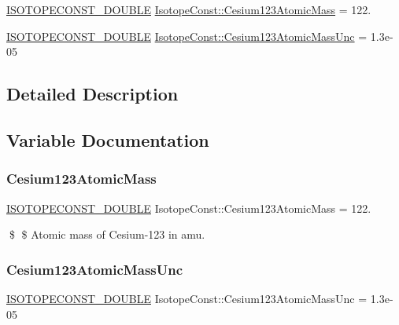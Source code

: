 \begin{DoxyCompactItemize}
\item 
\mbox{\hyperlink{group___isotope_const-_macros_ga8f45a7272ce02c0b4c65c44636ed719a}{I\+S\+O\+T\+O\+P\+E\+C\+O\+N\+S\+T\+\_\+\+D\+O\+U\+B\+LE}} \mbox{\hyperlink{group___isotope_const-_cesium-_cs123_gaa872133985113e652a28419c9e14dd48}{Isotope\+Const\+::\+Cesium123\+Atomic\+Mass}} = 122.
\item 
\mbox{\hyperlink{group___isotope_const-_macros_ga8f45a7272ce02c0b4c65c44636ed719a}{I\+S\+O\+T\+O\+P\+E\+C\+O\+N\+S\+T\+\_\+\+D\+O\+U\+B\+LE}} \mbox{\hyperlink{group___isotope_const-_cesium-_cs123_gab71ac0a46a95a079785107cbdcbf6e0a}{Isotope\+Const\+::\+Cesium123\+Atomic\+Mass\+Unc}} = 1.\+3e-\/05
\end{DoxyCompactItemize}


\subsection{Detailed Description}


\subsection{Variable Documentation}
\mbox{\label{group___isotope_const-_cesium-_cs123_gaa872133985113e652a28419c9e14dd48}} 
\subsubsection{\texorpdfstring{Cesium123\+Atomic\+Mass}{Cesium123AtomicMass}}
{\footnotesize\ttfamily \mbox{\hyperlink{group___isotope_const-_macros_ga8f45a7272ce02c0b4c65c44636ed719a}{I\+S\+O\+T\+O\+P\+E\+C\+O\+N\+S\+T\+\_\+\+D\+O\+U\+B\+LE}} Isotope\+Const\+::\+Cesium123\+Atomic\+Mass = 122.}

\$ \$ Atomic mass of Cesium-\/123 in amu. \mbox{\label{group___isotope_const-_cesium-_cs123_gab71ac0a46a95a079785107cbdcbf6e0a}} 
\subsubsection{\texorpdfstring{Cesium123\+Atomic\+Mass\+Unc}{Cesium123AtomicMassUnc}}
{\footnotesize\ttfamily \mbox{\hyperlink{group___isotope_const-_macros_ga8f45a7272ce02c0b4c65c44636ed719a}{I\+S\+O\+T\+O\+P\+E\+C\+O\+N\+S\+T\+\_\+\+D\+O\+U\+B\+LE}} Isotope\+Const\+::\+Cesium123\+Atomic\+Mass\+Unc = 1.\+3e-\/05}

